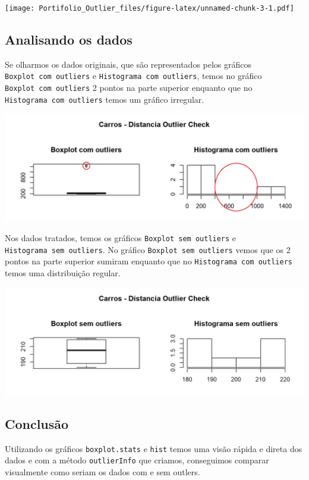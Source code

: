 \documentclass[]{article}
\newenvironment{Shaded}{\begin{snugshade}}{\end{snugshade}}
\newcommand{\KeywordTok}[1]{\textcolor[rgb]{0.13,0.29,0.53}{\textbf{#1}}}
\newcommand{\NormalTok}[1]{#1}
\newcommand{\OperatorTok}[1]{\textcolor[rgb]{0.81,0.36,0.00}{\textbf{#1}}}
\newcommand{\OtherTok}[1]{\textcolor[rgb]{0.56,0.35,0.01}{#1}}
\newcommand{\StringTok}[1]{\textcolor[rgb]{0.31,0.60,0.02}{#1}}
\begin{document}
\begin{Shaded}
\end{Shaded}

\texttt{[image: Portifolio\_Outlier\_files/figure-latex/unnamed-chunk-3-1.pdf]}

\hypertarget{analisando-os-dados}{%
\subsection{Analisando os dados}\label{analisando-os-dados}}

Se olharmos os dados originais, que são representados pelos gráficos
\texttt{Boxplot\ com\ outliers} e \texttt{Histograma\ com\ outliers},
temos no gráfico \texttt{Boxplot\ com\ outliers} 2 pontos na parte
superior enquanto que no \texttt{Histograma\ com\ outliers} temos um
gráfico irregular.

\includegraphics{Portifolio_Outlier_outlierInfo_result_com_outlier.png}

Nos dados tratados, temos os gráficos \texttt{Boxplot\ sem\ outliers} e
\texttt{Histograma\ sem\ outliers}. No gráfico
\texttt{Boxplot\ sem\ outliers} vemos que os 2 pontos na parte superior
sumiram enquanto que no \texttt{Histograma\ com\ outliers} temos uma
distribuição regular.

\includegraphics{Portifolio_Outlier_outlierInfo_result_sem_outlier.png}

\hypertarget{conclusao}{%
\subsection{Conclusão}\label{conclusao}}

Utilizando os gráficos \texttt{boxplot.stats} e \texttt{hist} temos uma
visão rápida e direta dos dados e com a método \texttt{outlierInfo} que
criamos, conseguimos comparar visualmente como seriam os dados com e sem
outlers.
\end{document}
